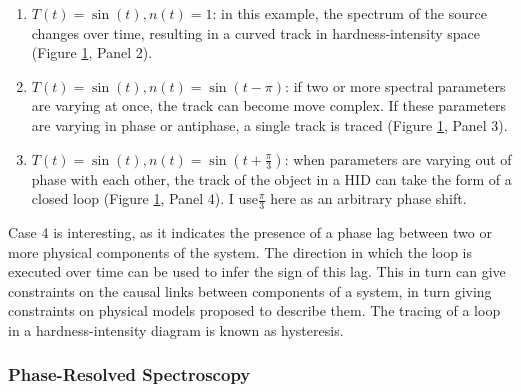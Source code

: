 \begin{enumerate}
\begin{figure}
   \label{fig:HIDexp}
\end{figure}
\item $T(t)=\sin(t), n(t)=1$: in this example, the spectrum of the source changes over time, resulting in a curved track in hardness-intensity space (Figure \ref{fig:HIDexp}, Panel 2).
\item $T(t)=\sin(t), n(t)=\sin(t-\pi)$: if two or more spectral parameters are varying at once, the track can become move complex.  If these parameters are varying in phase or antiphase, a single track is traced (Figure \ref{fig:HIDexp}, Panel 3).
\item $T(t)=\sin(t), n(t)=\sin\left(t+\frac{\pi}{3}\right)$: when parameters are varying out of phase with each other, the track of the object in a HID can take the form of a closed loop (Figure \ref{fig:HIDexp}, Panel 4).  I use$\frac{\pi}{3}$ here as an arbitrary phase shift.
\end{enumerate}
Case 4 is interesting, as it indicates the presence of a phase lag between two or more physical components of the system.  The direction in which the loop is executed over time can be used to infer the sign of this lag.  This in turn can give constraints on the causal links between components of a system, in turn giving constraints on physical models proposed to describe them.  The tracing of a loop in a hardness-intensity diagram is known as hysteresis.

\subsubsection{Phase-Resolved Spectroscopy}

\label{sec:phasresspec}

